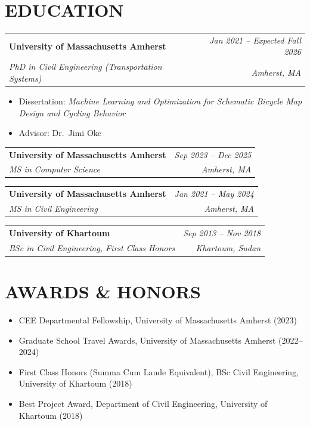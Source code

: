 \documentclass[10pt, a4paper]{article}
\makeatletter
\newcommand{\entry}[4]{%
  \noindent
  \begin{tabularx}{\linewidth}{@{}X@{\hspace{4pt}}r@{}}
    \textbf{#1} & \textit{\small\color{subtle}#2} \\
    \textit{\small\color{subtle}#3} & \textit{\small\color{subtle}#4}
  \end{tabularx}\vspace{2pt}%
}
\makeatother
\begin{document}
\vspace{0.3cm}

\section{EDUCATION}


\entry{University of Massachusetts Amherst}{Jan 2021 -- Expected Fall 2026}
      {PhD in Civil Engineering (Transportation Systems)
      }{Amherst, MA}

\begin{itemize}
  \item Dissertation: \textit{Machine Learning and Optimization for Schematic Bicycle Map Design and Cycling Behavior}%
  \item Advisor: Dr.\ Jimi Oke 
\end{itemize}

\vspace{3pt}
\entry{University of Massachusetts Amherst}{Sep 2023 -- Dec 2025}
      {MS in Computer Science
      }{Amherst, MA}
\vspace{3pt}
\entry{University of Massachusetts Amherst}{Jan 2021 -- May 2024}
      {MS in Civil Engineering 
      }{Amherst, MA}
\vspace{6pt}
\entry{University of Khartoum}{Sep 2013 -- Nov 2018}
      {BSc in Civil Engineering, First Class Honors}{Khartoum, Sudan}
\section{AWARDS \& HONORS}
\begin{itemize}
  \item CEE Departmental Fellowship, University of Massachusetts Amherst (2023)
  \item Graduate School Travel Awards, University of Massachusetts Amherst (2022--2024)
  \item First Class Honors (Summa Cum Laude Equivalent), BSc Civil Engineering, University of Khartoum (2018)
  \item Best Project Award, Department of Civil Engineering, University of Khartoum (2018)

\end{itemize}
\end{document}
